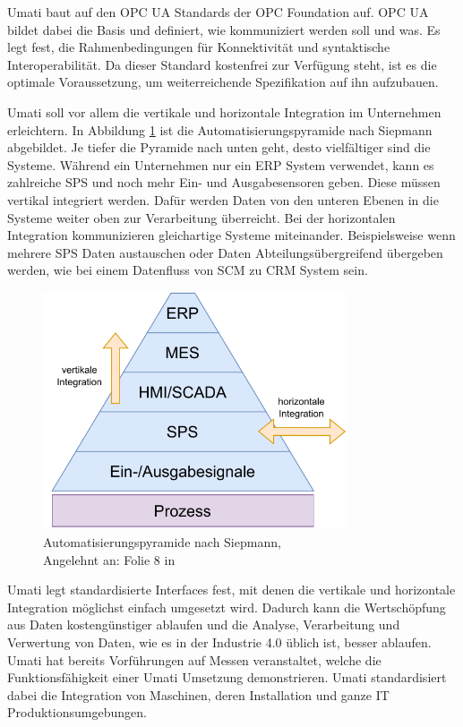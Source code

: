 \documentclass[a4paper, 12pt, oneside]{scrbook}
\begin{document}
		Umati baut auf den OPC UA Standards der OPC Foundation auf. OPC UA bildet dabei die Basis und definiert, wie kommuniziert werden soll und was. Es legt fest, die Rahmenbedingungen für Konnektivität und syntaktische Interoperabilität. Da dieser Standard kostenfrei zur Verfügung steht, ist es die optimale Voraussetzung, um weiterreichende Spezifikation auf ihn aufzubauen. \cite{noauthor_umati_2023}
		
		Umati soll vor allem die vertikale und horizontale Integration im Unternehmen erleichtern. In Abbildung \ref{fig:Automatisierungspyramide} ist die Automatisierungspyramide nach Siepmann abgebildet. Je tiefer die Pyramide nach unten geht, desto vielfältiger sind die Systeme. Während ein Unternehmen nur ein \ac{ERP} System verwendet, kann es zahlreiche SPS und noch mehr Ein- und Ausgabesensoren geben. Diese müssen vertikal integriert werden. Dafür werden Daten von den unteren Ebenen in die Systeme weiter oben zur Verarbeitung überreicht. Bei der horizontalen Integration kommunizieren gleichartige Systeme miteinander. Beispielsweise wenn mehrere SPS Daten austauschen oder Daten Abteilungsübergreifend übergeben werden, wie bei einem Datenfluss von SCM zu CRM System sein. 
		
		\begin{figure}[H]
			\centering
			\includegraphics[width=0.8\textwidth]{res/diagramms/Automatisierungspyramide.pdf}
			\caption{Automatisierungspyramide nach Siepmann, \\ Angelehnt an: Folie 8 in \cite{mielebacher_verteilte_2021}} 
			\label{fig:Automatisierungspyramide}
		\end{figure}
		
		Umati legt standardisierte Interfaces fest, mit denen die vertikale und horizontale Integration möglichst einfach umgesetzt wird. Dadurch kann die Wertschöpfung aus Daten kostengünstiger ablaufen und die Analyse, Verarbeitung und Verwertung von Daten, wie es in der Industrie 4.0 üblich ist, besser ablaufen. Umati hat bereits Vorführungen auf Messen veranstaltet, welche die Funktionsfähigkeit einer Umati Umsetzung demonstrieren. Umati standardisiert dabei die Integration von Maschinen, deren Installation und ganze IT Produktionsumgebungen. \cite{noauthor_about_nodate}
		
\end{document}
